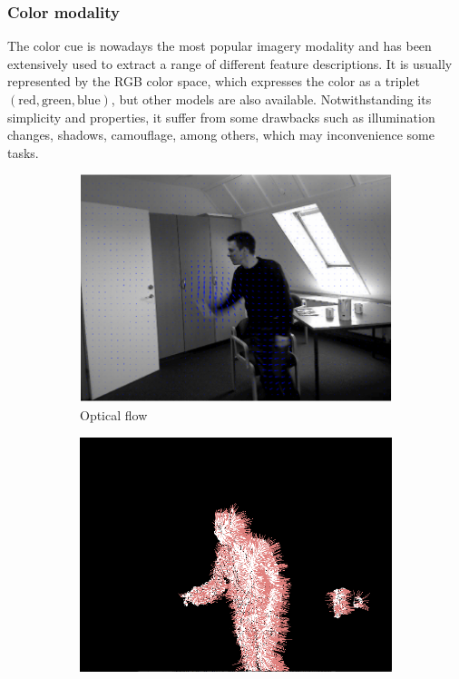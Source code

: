 \documentclass[10pt,twocolumn,letterpaper]{article}
\begin{document}
\subsubsection{Color modality}
\label{sssec:color}

The color cue is nowadays the most popular imagery modality and has been extensively used to extract a range of different feature descriptions. It is usually represented by the RGB color space, which expresses the color as a triplet $(\text{red}, \text{green}, \text{blue})$, but other models are also available. Notwithstanding its simplicity and properties, it suffer from some drawbacks such as illumination changes, shadows, camouflage, among others, which may inconvenience some tasks.

\begin{figure}
	\center
        \begin{subfigure}[b]{0.45\textwidth}
                \includegraphics[width=\textwidth]{opticalflow_final.eps}
                \caption{Optical flow}
                \label{fig:opticalflow}
        \end{subfigure}
        \begin{subfigure}[b]{0.45\textwidth}
                \includegraphics[width=\textwidth]{normals.png}

\end{subfigure}
\end{figure}
\end{document}
